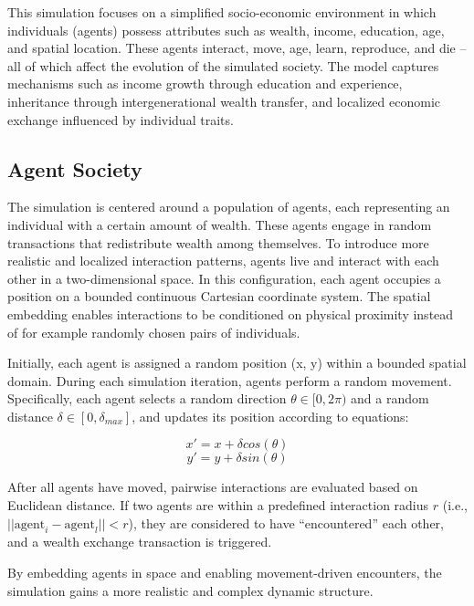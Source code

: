 \documentclass[english]{projectreport}
\begin{document}
This simulation focuses on a simplified socio-economic environment in which individuals (agents) possess attributes such as wealth, income, education, age, and spatial location. These agents interact, move, age, learn, reproduce, and die – all of which affect the evolution of the simulated society. The model captures mechanisms such as income growth through education and experience, inheritance through intergenerational wealth transfer, and localized economic exchange influenced by individual traits.

\subsection{Agent Society}

The simulation is centered around a population of agents, each representing an individual with a certain amount of wealth. These agents engage in random transactions that redistribute wealth among themselves. To introduce more realistic and localized interaction patterns, agents live and interact with each other in a two-dimensional space. In this configuration, each agent occupies a position on a bounded continuous Cartesian coordinate system. The spatial embedding enables interactions to be conditioned on physical proximity instead of for example randomly chosen pairs of individuals.

Initially, each agent is assigned a random position (x, y) within a bounded spatial domain. During each simulation iteration, agents perform a random movement. Specifically, each agent selects a random direction $\theta \in [0, 2\pi)$ and a random distance $\delta \in [0, \delta_{max}]$, and updates its position according to equations:

\begin{equation}
    x' = x + \delta cos(\theta)
\end{equation}
\begin{equation}
    y' = y + \delta sin(\theta)
\end{equation}

After all agents have moved, pairwise interactions are evaluated based on Euclidean distance. If two agents are within a predefined interaction radius $r$ (i.e., $||\text{agent}_i - \text{agent}_l|| < r$), they are considered to have “encountered” each other, and a wealth exchange transaction is triggered.

By embedding agents in space and enabling movement-driven encounters, the simulation gains a more realistic and complex dynamic structure.
\end{document}
